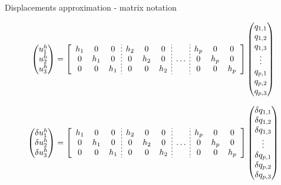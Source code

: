 \documentclass[aspectratio=169]{beamer}
\begin{document}
\begin{frame}{Displacements approximation - matrix notation}
  \begin{block}{}
    {\small
      $$\begin{pmatrix}
          u_{1}^{h} \\
          u_{2}^{h} \\
          u_{3}^{h} \\
        \end{pmatrix}
        =
        \left[
          \begin{array}{ccc;{2pt/2pt}ccc;{2pt/2pt}c;{2pt/2pt}ccc}
            h_{1} & 0     & 0     & h_{2} & 0     & 0     &       & h_{p} & 0     & 0     \\
            0     & h_{1} & 0     & 0     & h_{2} & 0     & \dots & 0     & h_{p} & 0     \\
            0     & 0     & h_{1} & 0     & 0     & h_{2} &       & 0     & 0     & h_{p} \\
          \end{array} \right]
        \begin{pmatrix}
          q_{1,1} \\
          q_{1,2} \\
          q_{1,3} \\
          \vdots  \\
          q_{p,1} \\
          q_{p,2} \\
          q_{p,3} \\
        \end{pmatrix}
      $$

      $$\begin{pmatrix}
          \delta u_{1}^{h} \\
          \delta u_{2}^{h} \\
          \delta u_{3}^{h} \\
        \end{pmatrix}
        =
        \left[
          \begin{array}{ccc;{2pt/2pt}ccc;{2pt/2pt}c;{2pt/2pt}ccc}
            h_{1} & 0     & 0     & h_{2} & 0     & 0     &       & h_{p} & 0     & 0     \\
            0     & h_{1} & 0     & 0     & h_{2} & 0     & \dots & 0     & h_{p} & 0     \\
            0     & 0     & h_{1} & 0     & 0     & h_{2} &       & 0     & 0     & h_{p} \\
          \end{array} \right]
        \begin{pmatrix}
          \delta  q_{1,1} \\
          \delta q_{1,2}  \\
          \delta q_{1,3}  \\
          \vdots          \\
          \delta  q_{p,1} \\
          \delta q_{p,2}  \\
          \delta q_{p,3}  \\
        \end{pmatrix}
      $$
    }
  \end{block}
\end{frame}
\end{document}
